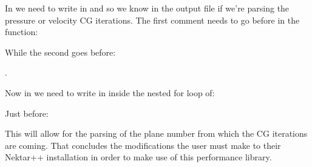 In  we need to write in  and  so we know in the output file if we're parsing the pressure or velocity CG iterations. The first comment needs to go before  in the function:


While the second goes before:

.

Now in  we need to write in  inside the nested for loop of:


Just before:


This will allow for the parsing of the plane number from which the CG iterations are coming. That concludes the modifications the user must make to their Nektar++ installation in order to make use of this performance library.






